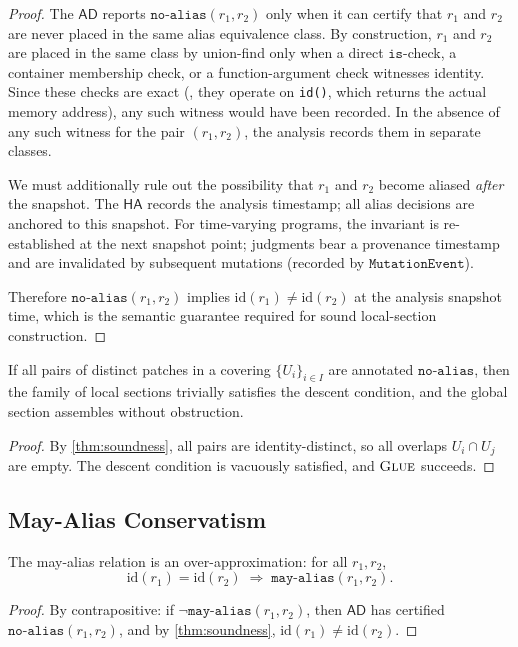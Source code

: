 \documentclass[11pt]{article}
\newcommand{\MayAlias}{\ensuremath{\mathtt{may\text{-}alias}}}  %
\newcommand{\NoAlias}{\ensuremath{\mathtt{no\text{-}alias}}}     %
\newcommand{\AD}{\mathsf{AD}}               %
\newcommand{\HA}{\mathsf{HA}}               %
\begin{document}
\begin{proof}
  The $\AD$ reports $\NoAlias(r_1,r_2)$ only when it can certify that
  $r_1$ and $r_2$ are never placed in the same alias equivalence class.
  By construction, $r_1$ and $r_2$ are placed in the same class by
  union-find only when a direct $\mathtt{is}$-check, a container
  membership check, or a function-argument check witnesses identity.
  Since these checks are exact (\ie, they operate on \texttt{id()},
  which returns the actual memory address), any such witness would have
  been recorded.  In the absence of any such witness for the pair
  $(r_1, r_2)$, the analysis records them in separate classes.

  We must additionally rule out the possibility that $r_1$ and $r_2$
  become aliased \emph{after} the snapshot.  The $\HA$ records the
  analysis timestamp; all alias decisions are anchored to this snapshot.
  For time-varying programs, the invariant is re-established at the next
  snapshot point; judgments bear a provenance timestamp and are
  invalidated by subsequent mutations (recorded by $\mathtt{MutationEvent}$).

  Therefore $\NoAlias(r_1,r_2)$ implies $\mathrm{id}(r_1)\neq
  \mathrm{id}(r_2)$ at the analysis snapshot time, which is the
  semantic guarantee required for sound local-section construction.
\end{proof}

\begin{corollary}
  \label{cor:sheaf-consistency}
  If all pairs of distinct patches in a covering $\{U_i\}_{i \in I}$
  are annotated $\NoAlias$, then the family of local sections trivially
  satisfies the descent condition, and the global section assembles
  without obstruction.
\end{corollary}
\begin{proof}
  By \cref{thm:soundness}, all pairs are identity-distinct, so all
  overlaps $U_i \cap U_j$ are empty.  The descent condition is vacuously
  satisfied, and $\textsc{Glue}{}$ succeeds.
\end{proof}

\subsection{May-Alias Conservatism}

\begin{theorem}
  \label{thm:may-alias-approx}
  The may-alias relation is an over-approximation: for all $r_1, r_2$,
  \[
    \mathrm{id}(r_1) = \mathrm{id}(r_2) \;\Rightarrow\; \MayAlias(r_1,r_2).
  \]
\end{theorem}
\begin{proof}
  By contrapositive: if $\neg\MayAlias(r_1,r_2)$, then $\AD$ has
  certified $\NoAlias(r_1,r_2)$, and by \cref{thm:soundness},
  $\mathrm{id}(r_1)\neq\mathrm{id}(r_2)$.
\end{proof}
\end{document}
